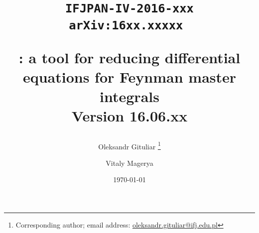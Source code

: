 \title{
  \begin{flushright}
  \tt\normalsize{IFJPAN-IV-2016-xxx}\\ 
  \tt\normalsize{arXiv:16xx.xxxxx} 
  \end{flushright}
  \vspace{1cm}
  \Large \bf \fuchsia: a tool for reducing differential equations for Feynman master integrals\\
  \vspace{0.5cm}
  \normalsize \bf Version 16.06.xx
}

\author[a]{Oleksandr Gituliar%
    \thanks{Corresponding author; email address:
        \href{mailto:oleksandr.gituliar@ifj.edu.pl}
            {oleksandr.gituliar@ifj.edu.pl}}}

\author[ ]{Vitaly Magerya}


\date{\today\\\vspace{0.5cm}{\bf \LARGE THIS IS A DRAFT}}
